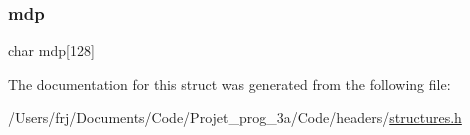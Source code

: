 \hypertarget{structutilisateur_a8af71e7f7d7c4089896f8f6498d53a22}{}\label{structutilisateur_a8af71e7f7d7c4089896f8f6498d53a22} 
\subsubsection{\texorpdfstring{mdp}{mdp}}
{\footnotesize\ttfamily char mdp\mbox{[}128\mbox{]}}



The documentation for this struct was generated from the following file\+:\begin{DoxyCompactItemize}
\item 
/\+Users/frj/\+Documents/\+Code/\+Projet\+\_\+prog\+\_\+3a/\+Code/headers/\hyperlink{structures_8h}{structures.\+h}\end{DoxyCompactItemize}
